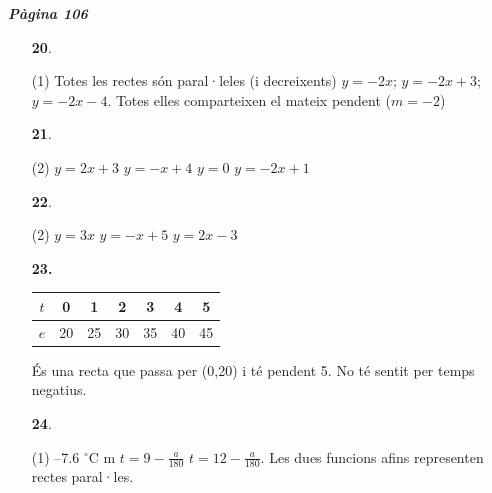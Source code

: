 \documentclass[a4paper, pdf, twoside]{book}
\begin{document}
\begin{multicols}{2}

{\textbf{\em Pàgina 106}} \hrulefill
\begin{enumerate}
\vspace{0.25cm}



 \item[\fontfamily{phv}\selectfont\color{blue}\textbf{20}. ] 
 \begin{tasks}[column-sep=1em, item-indent=1.3333em](1)
	 \task* Totes les rectes són paral·leles (i decreixents)
	 \task* $y=-2x$; $y=-2x+3$; $y=-2x-4$. Totes elles comparteixen el mateix pendent ($m=-2$) 
\end{tasks}
 \end{enumerate}
\begin{enumerate}
\vspace{0.25cm}



 \item[\fontfamily{phv}\selectfont\color{blue}\textbf{21}. ] 
 \begin{tasks}[column-sep=1em, item-indent=1.3333em](2)
	 \task $y=2x+3$
	 \task $y=-x+4$
	 \task $y=0$
	 \task $y=-2x+1$
\end{tasks}
\vspace{0.25cm}



 \item[\fontfamily{phv}\selectfont\color{blue}\textbf{22}. ] 
 \begin{tasks}[column-sep=1em, item-indent=1.3333em](2)
	 \task $y=3x$
	 \task $y=-x+5$
	 \task $y=2x-3$
\end{tasks}
\vspace{0.25cm}
\item[\fontfamily{phv}\selectfont\color{blue}\textbf{23. }] 
\begin {tabular}[]{|c|c|c|c|c|c|c|}\hline $t$ & 0 & 1 & 2 & 3 & 4 & 5 \\ \hline $e$ & 20 & 25 & 30 & 35 & 40 & 45 \\ \hline \end {tabular} \par És una recta que passa per (0,20) i té pendent 5. No té sentit per temps negatius. 
\vspace{0.25cm}



 \item[\fontfamily{phv}\selectfont\color{blue}\textbf{24}. ] 
 \begin{tasks}[column-sep=1em, item-indent=1.3333em](1)
	 \task --7.6 $^\circ $C
	  m
	 \task $t=9-\frac {a}{180}$
	 \task* $t=12-\frac {a}{180}$. Les dues funcions afins representen rectes paral·les.
\end{tasks}
 \end{enumerate}
\vspace{0.3cm}


\end{multicols}
\end{document}
